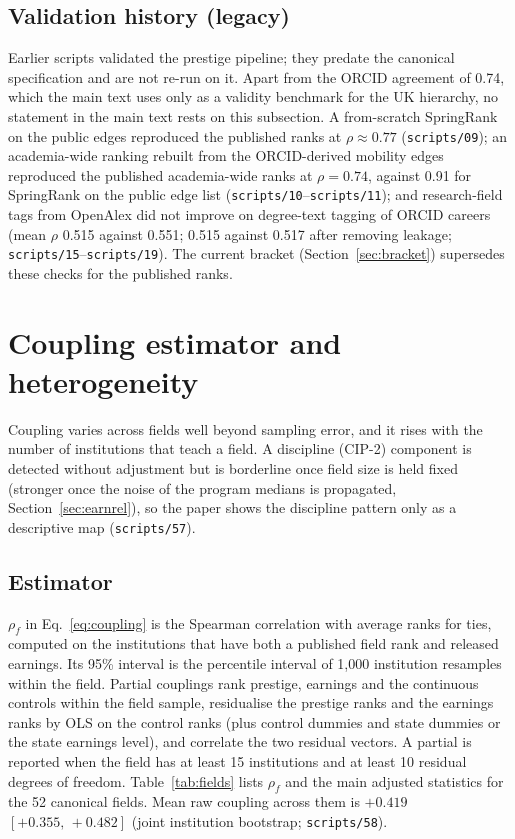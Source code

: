 \documentclass[11pt]{article}
\newcommand{\ci}[2]{$[#1,\allowbreak\,#2]$}
\newcommand{\scr}[1]{\texttt{scripts/#1}}
\begin{document}
\subsection{Validation history (legacy)}\label{sec:validation}

Earlier scripts validated the prestige pipeline; they predate the canonical specification and are not re-run on
it. Apart from the ORCID agreement of 0.74, which the main text uses only as a validity benchmark for the UK
hierarchy, no statement in the main text rests on this subsection. A from-scratch SpringRank on the public edges reproduced the published ranks at $\rho\approx0.77$
(\scr{09}); an academia-wide ranking rebuilt from the ORCID-derived mobility edges \citep{li2026orcid} reproduced
the published academia-wide ranks at
$\rho=0.74$, against 0.91 for SpringRank on the public edge list (\scr{10}--\scr{11}); and research-field tags from
OpenAlex \citep{priem2022openalex} did not improve on degree-text tagging of ORCID careers (mean $\rho$ 0.515 against 0.551; 0.515
against 0.517 after removing leakage; \scr{15}--\scr{19}). The current bracket (Section~\ref{sec:bracket})
supersedes these checks for the published ranks.

\clearpage
\section{Coupling estimator and heterogeneity}\label{sec:coupling}

Coupling varies across fields well beyond sampling error, and it rises with the number of institutions that
teach a field. A discipline (CIP-2) component is detected without adjustment but is borderline once field size
is held fixed (stronger once the noise of the program medians is propagated, Section~\ref{sec:earnrel}), so the
paper shows the discipline pattern only as a descriptive map (\scr{57}).

\subsection{Estimator}\label{sec:estimator}

$\rho_f$ in Eq.~\eqref{eq:coupling} is the Spearman correlation with average ranks for ties, computed on the
institutions that have both a published field rank and released earnings. Its 95\% interval is the percentile
interval of 1,000 institution resamples within the field. Partial couplings rank prestige, earnings and the
continuous controls within the field sample, residualise the prestige ranks and the earnings ranks by OLS on
the control ranks (plus control dummies and state dummies or the state earnings level), and correlate the two
residual vectors. A partial is reported when the field has at least 15 institutions and at least 10 residual
degrees of freedom. Table~\ref{tab:fields} lists $\rho_f$ and the main adjusted statistics for the 52 canonical
fields. Mean raw coupling across them is $+0.419$ \ci{+0.355}{+0.482} (joint institution bootstrap; \scr{58}).
\end{document}
